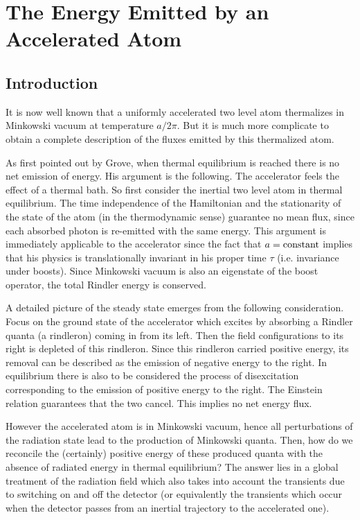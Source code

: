 \section{The Energy Emitted by an Accelerated Atom}\label{EnAt}

\subsection{Introduction}\label{Intro2}

It is now well known that a uniformly accelerated two level atom
thermalizes in Minkowski vacuum at temperature $a/2 \pi$\cite{Unruh}.
But it is much more complicate to obtain a complete description
of the fluxes emitted by this thermalized atom.

As first pointed out by Grove\cite{Grove}, when thermal equilibrium is
reached there is no net  emission of energy.
His argument is the following. The accelerator feels the
effect
of a thermal bath.
So first consider the inertial two level atom in thermal equilibrium. The
time independence of the Hamiltonian and the
stationarity of the
state of the atom (in the thermodynamic sense) guarantee no mean flux,
since each
absorbed photon is re-emitted  with the
same energy.
This argument is immediately applicable to the accelerator since the
fact that $a={\rm constant}$ implies that his physics is translationally
invariant in his proper time $\tau $
(i.e. invariance under boosts). Since Minkowski
vacuum is
also an eigenstate of the boost operator, the total
Rindler energy is conserved.

A detailed picture of the steady state emerges from the following
consideration. Focus on the ground state of the accelerator which excites
by absorbing a Rindler quanta (a rindleron) coming in from its left. Then the
field
configurations  to its right is depleted of this rindleron. Since this
rindleron carried positive energy, its removal  can be described as the
emission of  negative energy to the right. In equilibrium there is also to be
considered the process of disexcitation corresponding to the emission of
positive energy   to the right. The Einstein relation
guarantees that the two cancel.
This implies no net energy flux.

However the accelerated atom is
in Minkowski vacuum, hence all perturbations of the radiation state
lead
to
the
production of Minkowski quanta.
Then, how do we reconcile the (certainly) positive energy of
these
produced quanta with the absence of radiated energy in thermal equilibrium?
The
answer
lies in a
global treatment of the radiation field which also takes into account the
transients due to switching on and off the detector (or equivalently
the transients which occur when the detector passes from an
inertial trajectory to the accelerated one).

